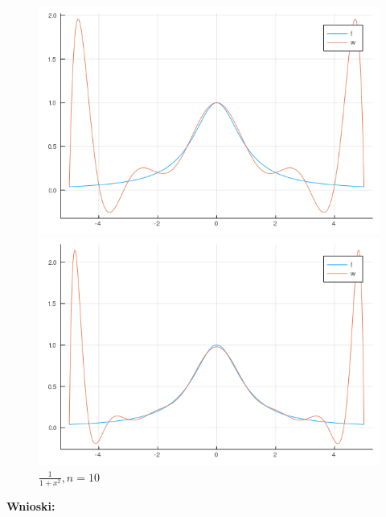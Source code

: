 \documentclass[12pt]{article}
\begin{document}
\begin{figure}[!htb]
  \includegraphics[width=\linewidth]{myplot_4_10.png}
  \caption{$\frac{1}{1+x^2}, n=5$}
\endminipage\hfill
{}
  \includegraphics[width=\linewidth]{myplot_4_15.png}
  \caption{$\frac{1}{1+x^2}, n=10$}
\endminipage
\end{figure}

\clearpage
\noindent \textbf{Wnioski:}\\
\end{document}
